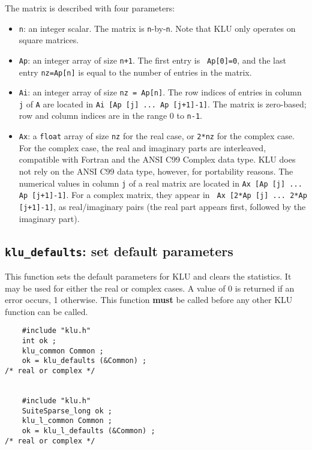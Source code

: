 \documentclass[11pt]{article}
\begin{document}
The matrix is described with four parameters:

\begin{itemize}
\item {\tt n}: an integer scalar.  The matrix is {\tt n}-by-{\tt n}.  Note that
KLU only operates on square matrices.

\item {\tt Ap}: an integer array of size {\tt n+1}.  The first entry is {\tt
Ap[0]=0}, and the last entry {\tt nz=Ap[n]} is equal to the number of entries
in the matrix.

\item {\tt Ai}: an integer array of size {\tt nz = Ap[n]}.
The row indices of entries in column {\tt j} of {\tt A} are located in
{\tt Ai [Ap [j] ... Ap [j+1]-1]}.  The matrix is zero-based; row and column
indices are in the range 0 to {\tt n-1}.

\item {\tt Ax}: a {\tt float} array of size {\tt nz} for the real case, or
{\tt 2*nz} for the complex case.  For the complex case, the real and imaginary
parts are interleaved, compatible with Fortran and the ANSI C99 Complex data
type.  KLU does not rely on the ANSI C99 data type, however, for portability
reasons.  The numerical values in column {\tt j} of a real matrix are located
in {\tt Ax [Ap [j] ... Ap [j+1]-1]}.  For a complex matrix, they appear in {\tt
Ax [2*Ap [j] ... 2*Ap [j+1]-1]}, as real/imaginary pairs (the real part appears
first, followed by the imaginary part).

\end{itemize}

\subsection{{\tt klu\_defaults}: set default parameters}

This function sets the default parameters for KLU and clears the statistics.
It may be used for either the real or complex cases.  A value of 0 is returned
if an error occurs, 1 otherwise.  This function {\bf must} be called before
any other KLU function can be called.

{\footnotesize
\begin{verbatim}
    #include "klu.h"
    int ok ;
    klu_common Common ;
    ok = klu_defaults (&Common) ;                                             /* real or complex */


    #include "klu.h"
    SuiteSparse_long ok ;
    klu_l_common Common ;
    ok = klu_l_defaults (&Common) ;                                           /* real or complex */
\end{verbatim}
}
\end{document}

